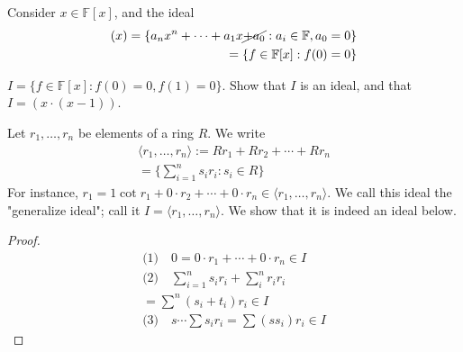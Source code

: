 \documentclass[12pt,oneside]{article}
\begin{document}
\begin{example}
  Consider $x \in \mathbb{F}[x]$, and the ideal 
  \begin{align*}
    (x) = \{a_n x^n + \cdots + a_1 x \cancel{+ a_0} : a_i \in \mathbb{F}, a_0 = 0\}\\
    = \{f \in \mathbb{F}[x] : f(0) = 0\}
  \end{align*}
\end{example}

\begin{example}
  $I = \{f \in \mathbb{F}[x] : f(0) = 0, f(1) = 0\}$. Show that $I$ is an ideal, and that $I = (x \cdot (x- 1))$.
\end{example}

\begin{definition}
  Let $r_1, \dots, r_n$ be elements of a ring $R$. We write 
  \begin{align*}
  \langle r_1 ,\dots, r_n \rangle  := Rr_1 + R r_2 + \cdots + R r_n\\
  = \{\sum_{i=1}^{n} s_i r_i : s_i \in R\}
\end{align*}
For instance, $r_1 = 1 \cot r_1 + 0 \cdot r_2 + \cdots + 0 \cdot r_n \in \langle r_1, \dots, r_n\rangle$. We call this ideal the "generalize ideal"; call it $I = \langle r_1, \dots, r_n \rangle$. We show that it is indeed an ideal below.
\end{definition}

\begin{proof}
  \begin{align*}
    \text{(1)} \quad 0 = 0 \cdot r_1 + \cdots  + 0 \cdot r_n \in I\\
    \text{(2)} \quad \sum_{i=1}^n s_i r_i + \sum_{i}^n r_i r_i\\
    = \sum^n (s_i + t_i)r_i \in I\\
    \text{(3)} \quad  s \cdots \sum s_i r_i = \sum (s s_i) r_i \in I
  \end{align*}
\end{proof}
\end{document}

